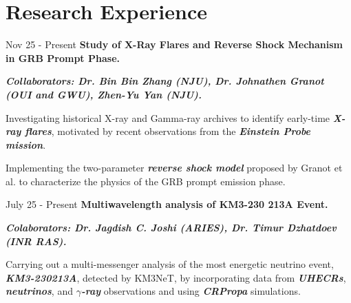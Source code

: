 \section{Research Experience}
        \vspace{0.10 cm}
        \begin{twocolentry}{
            Nov 25 - Present
        }
            \textbf{Study of X-Ray Flares and Reverse Shock Mechanism in GRB Prompt Phase.} \end{twocolentry}

        \begin{onecolentry}
            \textbf{\textit{Collaborators: Dr. Bin Bin Zhang (NJU), Dr. Johnathen Granot (OUI and GWU), Zhen-Yu Yan (NJU).}}\\
            
            \vspace{0.10 cm}
            \begin{highlights}
                \item Investigating historical X-ray and Gamma-ray archives to identify early-time \textbf{\textit{X-ray flares}}, motivated by recent observations from the \textbf{\textit{Einstein Probe mission}}.
            \item Implementing the two-parameter \textbf{\textit{reverse shock model}} proposed by Granot et al. to characterize the physics of the GRB prompt emission phase.
            \end{highlights}

        \end{onecolentry}
        
        \vspace{0.10 cm}
        \begin{twocolentry}{
            July 25 - Present
        }
            \textbf{Multiwavelength analysis of KM3-230 213A Event.} \end{twocolentry}

        \begin{onecolentry}
            \textbf{\textit{Colaborators: Dr. Jagdish C. Joshi (ARIES), Dr. Timur Dzhatdoev (INR RAS).}}\\
            
            \vspace{0.10 cm}
            \begin{highlights}
                \item Carrying out a multi-messenger analysis of the most energetic neutrino event, \textbf{\textit{KM3-230213A}}, detected by KM3NeT, by incorporating data from \textbf{\textit{UHECRs}}, \textbf{\textit{neutrinos}}, and \textbf{\textit{$\gamma$-ray}} observations and using \textbf{\textit{CRPropa}} simulations.
            \end{highlights}

        \end{onecolentry}
        
